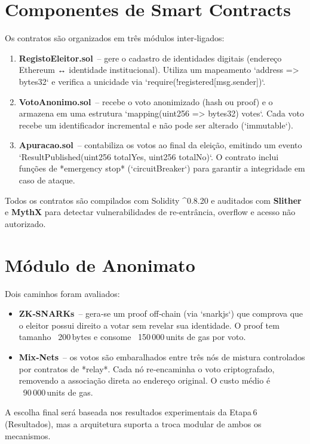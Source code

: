 \section{Componentes de Smart Contracts}
Os contratos são organizados em três módulos inter‑ligados:
\begin{enumerate}
    \item \textbf{RegistoEleitor.sol}\ – gere o cadastro de identidades digitais (endereço Ethereum ↔ identidade institucional). Utiliza um mapeamento `address => bytes32` e verifica a unicidade via `require(!registered[msg.sender])`.
    \item \textbf{VotoAnonimo.sol}\ – recebe o voto anonimizado (hash ou proof) e o armazena em uma estrutura `mapping(uint256 => bytes32) votes`. Cada voto recebe um identificador incremental e não pode ser alterado (`immutable`).
    \item \textbf{Apuracao.sol}\ – contabiliza os votos ao final da eleição, emitindo um evento `ResultPublished(uint256 totalYes, uint256 totalNo)`. O contrato inclui funções de *emergency stop* (`circuitBreaker`) para garantir a integridade em caso de ataque.
\end{enumerate}

Todos os contratos são compilados com Solidity \textasciicircum 0.8.20 e auditados com \textbf{Slither} e \textbf{MythX} para detectar vulnerabilidades de re-entrância, overflow e acesso não autorizado.

\section{Módulo de Anonimato}
Dois caminhos foram avaliados:
\begin{itemize}
    \item \textbf{ZK‑SNARKs}\ – gera‑se um proof off‑chain (via `snarkjs`) que comprova que o eleitor possui direito a votar sem revelar sua identidade. O proof tem tamanho ~200 bytes e consome ~150 000 units de gas por voto.
    \item \textbf{Mix‑Nets}\ – os votos são embaralhados entre três nós de mistura controlados por contratos de *relay*. Cada nó re‑encaminha o voto criptografado, removendo a associação direta ao endereço original. O custo médio é ~90 000 units de gas.
\end{itemize}
A escolha final será baseada nos resultados experimentais da Etapa 6 (Resultados), mas a arquitetura suporta a troca modular de ambos os mecanismos.

